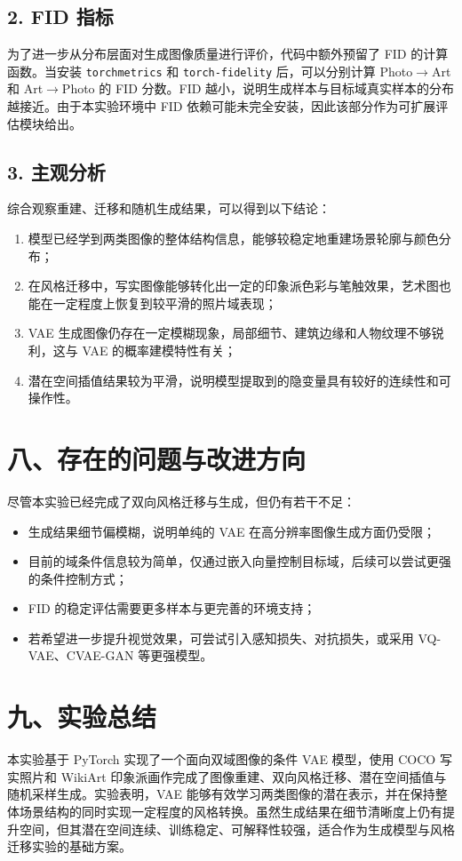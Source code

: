 \documentclass[12pt,a4paper]{ctexart}
\begin{document}
\subsection*{2. FID 指标}
为了进一步从分布层面对生成图像质量进行评价，代码中额外预留了 FID 的计算函数。当安装 \texttt{torchmetrics} 和 \texttt{torch-fidelity} 后，可以分别计算 Photo$\rightarrow$Art 和 Art$\rightarrow$Photo 的 FID 分数。FID 越小，说明生成样本与目标域真实样本的分布越接近。由于本实验环境中 FID 依赖可能未完全安装，因此该部分作为可扩展评估模块给出。

\subsection*{3. 主观分析}
综合观察重建、迁移和随机生成结果，可以得到以下结论：
\begin{enumerate}
    \item 模型已经学到两类图像的整体结构信息，能够较稳定地重建场景轮廓与颜色分布；
    \item 在风格迁移中，写实图像能够转化出一定的印象派色彩与笔触效果，艺术图也能在一定程度上恢复到较平滑的照片域表现；
    \item VAE 生成图像仍存在一定模糊现象，局部细节、建筑边缘和人物纹理不够锐利，这与 VAE 的概率建模特性有关；
    \item 潜在空间插值结果较为平滑，说明模型提取到的隐变量具有较好的连续性和可操作性。
\end{enumerate}

\section*{八、存在的问题与改进方向}
尽管本实验已经完成了双向风格迁移与生成，但仍有若干不足：
\begin{itemize}
    \item 生成结果细节偏模糊，说明单纯的 VAE 在高分辨率图像生成方面仍受限；
    \item 目前的域条件信息较为简单，仅通过嵌入向量控制目标域，后续可以尝试更强的条件控制方式；
    \item FID 的稳定评估需要更多样本与更完善的环境支持；
    \item 若希望进一步提升视觉效果，可尝试引入感知损失、对抗损失，或采用 VQ-VAE、CVAE-GAN 等更强模型。
\end{itemize}

\section*{九、实验总结}
本实验基于 PyTorch 实现了一个面向双域图像的条件 VAE 模型，使用 COCO 写实照片和 WikiArt 印象派画作完成了图像重建、双向风格迁移、潜在空间插值与随机采样生成。实验表明，VAE 能够有效学习两类图像的潜在表示，并在保持整体场景结构的同时实现一定程度的风格转换。虽然生成结果在细节清晰度上仍有提升空间，但其潜在空间连续、训练稳定、可解释性较强，适合作为生成模型与风格迁移实验的基础方案。
\end{document}
